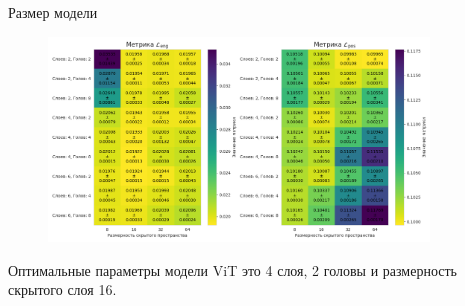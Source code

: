 \documentclass[9pt]{beamer}
\begin{document}
\begin{frame}{Размер модели}
    \begin{figure}
        \centering
        \includegraphics[width=0.9\textwidth]{../report/graphics/exp4_model_params_std.png}
    \end{figure}

    \begin{block}{}
        Оптимальные параметры модели ViT это 4 слоя, 2 головы и размерность скрытого слоя 16.
    \end{block}
\end{frame}
\end{document}
